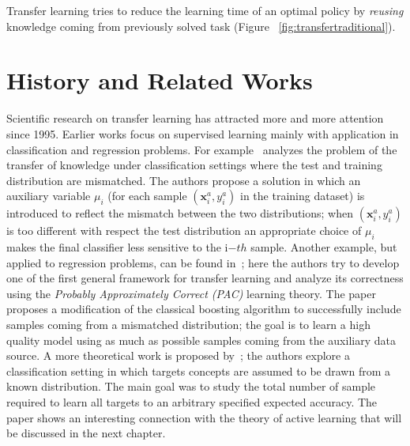   \noindent Transfer learning tries to reduce the learning time of an optimal policy by \textit{reusing} knowledge coming from
  previously solved task (Figure ~\ref{fig:transfertraditional}).\newline



  \section{History and Related Works}
    \noindent Scientific research on transfer learning has attracted more and more attention since 1995.\newline
    Earlier works focus on supervised learning mainly with application in classification and regression problems.
    For example~\cite{liao2005logistic} analyzes the problem of the transfer of knowledge under
    classification settings where the test and training distribution are mismatched. The authors
    propose a solution in which an auxiliary variable $\mu_i$ (for each sample $(\mathbf{x}_i^{a}, y_i^{a})$ in the training dataset)
    is introduced to reflect the mismatch between the two distributions; when $(\mathbf{x}_i^{a}, y_i^{a})$ is too
    different with respect the test distribution an appropriate choice of $\mu_i$ makes the final classifier
    less sensitive to the i$-th$ sample.\newline
    Another example, but applied to regression problems, can be found in~\cite{pardoe2010boosting}; here the authors
    try to develop one of the first general framework for transfer learning and analyze its correctness
    using the \textit{Probably Approximately Correct (PAC)} learning theory. The paper proposes a modification of the classical
    boosting algorithm to successfully include samples coming from a mismatched distribution; the goal is to learn a high
    quality model using as much as possible samples coming from the auxiliary data source.\newline
    A more theoretical work is proposed by~\cite{hanneke2013theory}; the authors explore
    a classification setting in which targets concepts are assumed to be drawn from a known
    distribution. The main goal was to study the total number of sample required to learn all targets to an
    arbitrary specified expected accuracy. The paper shows an interesting connection with the theory of
    active learning that will be discussed in the next chapter.\newline

